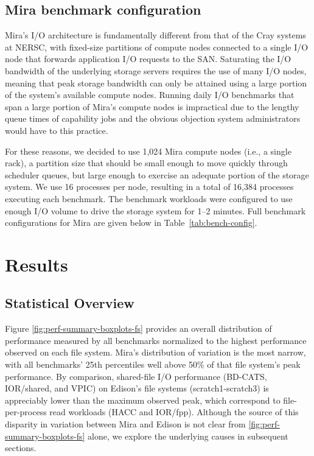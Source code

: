 \documentclass[conference,10pt,compsocconf]{IEEEtran}
\begin{document}
\subsection{Mira benchmark configuration} \label{sec:platforms/mirabenchmarks}

Mira's I/O architecture is fundamentally different from that of the Cray
systems at NERSC, with fixed-size partitions of compute nodes connected to
a single I/O node that forwards application I/O requests to the SAN.
Saturating the I/O bandwidth of the underlying storage servers requires the
use of many I/O nodes, meaning that peak storage bandwidth can only be
attained using a large portion of the system's available compute nodes.
Running daily I/O benchmarks that span a large portion of Mira's compute
nodes is impractical due to the lengthy queue times of capability jobs and
the obvious objection system administrators would have to this practice.

For these reasons, we decided to use 1,024 Mira compute nodes (i.e., a single
rack), a partition size that should be small enough to move quickly through
scheduler queues, but large enough to exercise an adequate portion of the
storage system. We use 16 processes per node, resulting in a total of 16,384
processes executing each benchmark. The benchmark workloads were configured
to use enough I/O volume to drive the storage system for 1--2 minutes.
Full benchmark configurations for Mira are given below in
Table~\ref{tab:bench-config}.

\section{Results} \label{sec:results}

\subsection{Statistical Overview} \label{sec:results/overview}

Figure \ref{fig:perf-summary-boxplots-fs} provides an overall distribution of
performance measured by all benchmarks normalized to the highest performance observed on each file system.  Mira's distribution of variation is the most narrow, with all benchmarks' 25th percentiles well above 50\% of that file system's peak performance.  By comparison, shared-file I/O performance (BD-CATS, IOR/shared, and VPIC) on Edison's file systems (scratch1-scratch3) is appreciably lower than the maximum observed peak, which correspond to file-per-process read workloads (HACC and IOR/fpp).  Although the source of this disparity in variation between Mira and Edison is not clear from \ref{fig:perf-summary-boxplots-fs} alone, we explore the underlying causes in subsequent sections.
\end{document}
